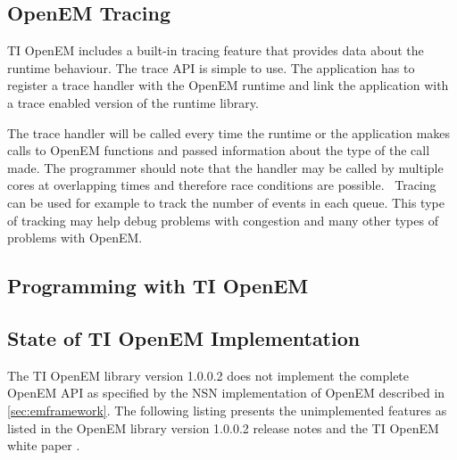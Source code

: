 \subsection{OpenEM Tracing}
\label{subsec:ti-tracing}
TI OpenEM includes a built-in tracing feature that provides data about the runtime behaviour. The trace API is simple to use. The application has to register a trace handler with the OpenEM runtime and link the application with a trace enabled version of the runtime library.~\cite{openemapi}

The trace handler will be called every time the runtime or the application makes calls to OpenEM functions and passed information about the type of the call made. The programmer should note that the handler may be called by multiple cores at overlapping times and therefore race conditions are possible.~\cite{openemapi} Tracing can be used for example to track the number of events in each queue. This type of tracking may help debug problems with congestion and many other types of problems with OpenEM.

\subsection{Programming with TI OpenEM}
\label{subsec:ti-init-layer}

\subsection{State of TI OpenEM Implementation}
\label{subsec:ti-implementation-state}
The TI OpenEM library version 1.0.0.2 does not implement the complete OpenEM API as specified by the NSN implementation of OpenEM described in \ref{sec:emframework}. The following listing presents the unimplemented features as listed in the OpenEM library version 1.0.0.2 release notes \cite{openemnotes} and the TI OpenEM white paper \cite{openemwhite}.

